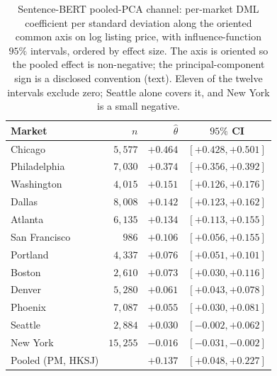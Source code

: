 \begin{table}[H]
\centering
\caption{Sentence-BERT pooled-PCA channel: per-market DML coefficient per standard
deviation along the oriented common axis on log listing price, with
influence-function $95\%$ intervals, ordered by effect size. The axis is oriented
so the pooled effect is non-negative; the principal-component sign is a disclosed
convention (text). Eleven of the twelve intervals exclude zero; Seattle alone
covers it, and New York is a small negative.}
\label{tab:baur-12city}
\small
\begin{tabular}{lrrc}
\toprule
Market & $n$ & $\hat\theta$ & $95\%$ CI \\
\midrule
Chicago       & $5{,}577$  & $+0.464$ & $[+0.428, +0.501]$ \\
Philadelphia  & $7{,}030$  & $+0.374$ & $[+0.356, +0.392]$ \\
Washington    & $4{,}015$  & $+0.151$ & $[+0.126, +0.176]$ \\
Dallas        & $8{,}008$  & $+0.142$ & $[+0.123, +0.162]$ \\
Atlanta       & $6{,}135$  & $+0.134$ & $[+0.113, +0.155]$ \\
San Francisco & $986$      & $+0.106$ & $[+0.056, +0.155]$ \\
Portland      & $4{,}337$  & $+0.076$ & $[+0.051, +0.101]$ \\
Boston        & $2{,}610$  & $+0.073$ & $[+0.030, +0.116]$ \\
Denver        & $5{,}280$  & $+0.061$ & $[+0.043, +0.078]$ \\
Phoenix       & $7{,}087$  & $+0.055$ & $[+0.030, +0.081]$ \\
Seattle       & $2{,}884$  & $+0.030$ & $[-0.002, +0.062]$ \\
New York      & $15{,}255$ & $-0.016$ & $[-0.031, -0.002]$ \\
\midrule
Pooled (PM, HKSJ) & & $+0.137$ & $[+0.048, +0.227]$ \\
\bottomrule
\end{tabular}
\end{table}

